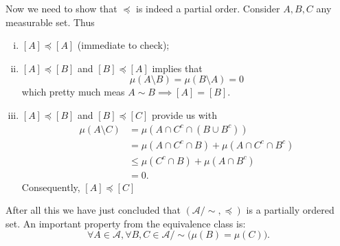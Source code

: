 \documentclass[11pt,twoside,a4paper]{article}
\begin{document}
Now we need to show that $\preceq$ is indeed a partial order.
Consider $A,B,C$ any measurable set. Thus
\begin{enumerate}[(i)]
    \item $[A] \preceq [A]$ (immediate to check); 

    \item $[A] \preceq [B]$ and $[B] \preceq [A]$  implies that  
    \begin{equation*}
        \mu(A \setminus B) = \mu(B \setminus A) = 0
    \end{equation*}
    which pretty much meas $A \sim B \implies [A] = [B]$.  

    \item $[A] \preceq [B]$ and $[B] \preceq [C]$ provide us with
    \begin{align*}
        \mu(A \setminus C)
            &=
            \mu(A \cap C^c \cap (B \cup B^c)) \\
            &=
            \mu(A \cap C^c \cap B) +
            \mu(A \cap C^c \cap B^c) \\
            & \leq
            \mu(C^c \cap B) + \mu(A  \cap B^c) \\
            & = 0.
    \end{align*}
    Consequently, $[A] \preceq [C]$  
\end{enumerate}

After all this we have just concluded that 
$(\mathcal{A}/\sim, \preceq)$ is a partially ordered set.
An important property from the equivalence class is:
\begin{equation*}
    \forall A \in \mathcal{A}, \forall B,C \in \mathcal{A}/\sim
    \Big( 
        \mu(B) = \mu(C)
    \Big).
\end{equation*}
\end{document}
